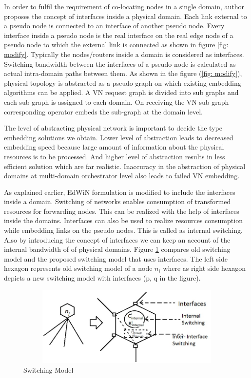 \documentclass[article,dr=phil,type=msc ,colorback,accentcolor=tud4b]{tudthesis}
\begin{document}
In order to fulfil the requirement of co-locating nodes in a single domain, author proposes the concept of interfaces inside a physical domain. Each link external to a pseudo node is connected to an interface of another pseudo node. Every interface inside a pseudo node is the real interface on the real edge node of a pseudo node to which the external link is connected as shown in figure \ref{fig: modify}. Typically the nodes/routers inside a domain is considered as interfaces. Switching bandwidth between the interfaces of a pseudo node is calculated as actual intra-domain paths between them. As shown in the figure (\ref{fig: modify}), physical topology is abstracted as a pseudo graph on which existing embedding algorithms can be applied. A VN request graph is divided into sub graphs and each sub-graph is assigned to each domain. On receiving the VN sub-graph corresponding operator embeds the sub-graph at the domain level. \newline

The level of abstracting physical network is important to decide the type embedding solutions we obtain. Lower level of abstraction leads to decreased embedding speed because large amount of information about the physical resources is to be processed. And higher level of abstraction results in less efficient solution which are far realistic. Inaccuracy in the abstraction of physical domains at multi-domain orchestrator level also leads to failed VN embedding.\newline

As explained earlier, EdWiN formulation is modified to include the interfaces inside a domain. Switching of networks enables consumption of transformed resources for forwarding nodes. This can be realized with the help of interfaces inside the domains. Interfaces can also be used to realize resources consumption while embedding links on the pseudo nodes. This is called as internal switching. Also by introducing the concept of interfaces we can keep an account of the internal bandwidth of of physical domains. Figure \ref{fig: sw_model} compares old switching model and the proposed switching model that uses interfaces. The left side hexagon represents old switching model of a node $n_{i}$ where as right side hexagon depicts a new switching model with interfaces (p, q in the figure). 
\begin{figure}[h]
	\centering
	\includegraphics[width=12cm, height=4cm]{sw_model.jpg}
	\caption{Switching Model}
	\label{fig: sw_model}
\end{figure}
\end{document}
